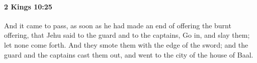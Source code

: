
		\paragraph{2 Kings 10:25} %
			\label{2KINGS-10-25}

			And it came to pass, as soon as he had made an end of offering the burnt offering, that Jehu said to the guard and to the captains, Go in, and slay them; let none come forth. And they smote them with the edge of the sword; and the guard and the captains cast them out, and went to the city of the house of Baal.


